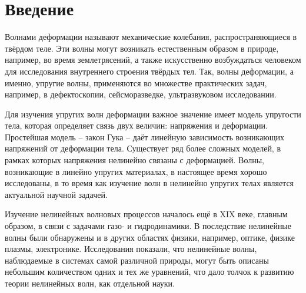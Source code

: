 \documentclass[12pt, a4paper]{report}
\begin{document}
\newpage
\setcounter{page}{4}
\tableofcontents



\chapter*{Введение}

Волнами деформации называют механические колебания, распространяющиеся в твёрдом теле. Эти волны могут возникать естественным образом в природе, например, во время землетрясений, а также искусственно возбуждаться человеком для исследования внутреннего строения твёрдых тел. Так, волны деформации, а именно, упругие волны, применяются во множестве практических задач, например, в дефектоскопии, сейсморазведке, ультразвуковом исследовании.

Для изучения упругих волн деформации важное значение имеет модель упругости тела, которая определяет связь двух величин: напряжения и деформации. Простейшая модель -- закон Гука -- даёт линейную зависимость возникающих напряжений от деформации тела. 
Существует ряд более сложных моделей, 
в рамках которых напряжения нелинейно связаны с деформацией. 
Волны, возникающие в линейно упругих материалах, в настоящее время хорошо исследованы, в то время как изучение волн в нелинейно упругих телах является актуальной научной задачей.

Изучение нелинейных волновых процессов началось ещё в XIX веке, главным образом, в связи с задачами газо- и гидродинамики. В последствие нелинейные волны были обнаружены и в других областях физики, например, оптике, физике плазмы, электронике. Исследования показали, что нелинейные волны, наблюдаемые в системах самой различной природы, могут быть описаны небольшим количеством одних и тех же уравнений, что дало толчок к развитию теории нелинейных волн, как отдельной науки.
\end{document}
